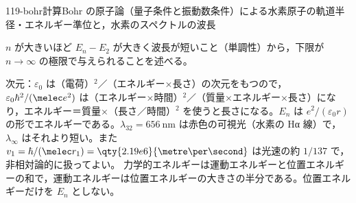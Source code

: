 \documentclass[uplatex,dvipdfmx,a4paper,11pt]{jsarticle}
\begin{document}
\begin{mondai}{119-bohr}{計算}{Bohr の原子論（量子条件と振動数条件）による水素原子の軌道半径・エネルギー準位と，水素のスペクトルの波長}
\begin{tadashii}
\begin{ronten}
  \item {} $n$ が大きいほど $E_{n}-E_{2}$ が大きく波長が短いこと（単調性）から，下限が $n\to\infty$ の極限で与えられることを述べる。
\end{ronten}
\kenzan 次元：$\varepsilon_{0}$ は（電荷）$^{2}$／（エネルギー×長さ）の次元をもつので，$\varepsilon_{0}\hbar^{2}/(\melec e^{2})$ は（エネルギー×時間）$^{2}$／（質量×エネルギー×長さ）になり，エネルギー＝質量×（長さ／時間）$^{2}$ を使うと長さになる。$E_{n}$ は $e^{2}/(\varepsilon_{0}r)$ の形でエネルギーである。$\lambda_{32}=\qty{656}{\nano\metre}$ は赤色の可視光（水素の Hα 線）で，$\lambda_{\infty}$ はそれより短い。また $v_{1}=\hbar/(\melec r_{1})=\qty{2.19e6}{\metre\per\second}$ は光速の約 $1/137$ で，非相対論的に扱ってよい。
\tsumazuki 力学的エネルギーは運動エネルギーと位置エネルギーの和で，運動エネルギーは位置エネルギーの大きさの半分である。位置エネルギーだけを $E_{n}$ としない。
\end{tadashii}
\end{mondai}

\noteowari
\end{document}
